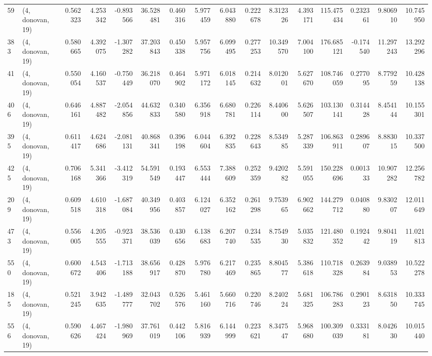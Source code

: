 \begin{tabular}{llrrrrrrrrrrrrrr}
59  &  (4, donovan, 19) &   0.562323 &   4.253342 &  -0.893566 &    36.528481 &   0.460316 &   5.977459 &   6.043880 &  0.222678 &   8.312326 &   4.393171 &   115.475434 &  0.232361 &   9.806910 &  10.745950 \\
383 &  (4, donovan, 19) &   0.580665 &   4.392075 &  -1.307282 &    37.203843 &   0.450338 &   5.957756 &   6.099495 &  0.277253 &  10.349570 &   7.004100 &   176.685121 & -0.174540 &  11.297243 &  13.292296 \\
41  &  (4, donovan, 19) &   0.550054 &   4.160537 &  -0.750449 &    36.218070 &   0.464902 &   5.971172 &   6.018145 &  0.214632 &   8.012001 &   5.627670 &   108.746059 &  0.277095 &   8.779259 &  10.428138 \\
406 &  (4, donovan, 19) &   0.646161 &   4.887482 &  -2.054856 &    44.632833 &   0.340580 &   6.356918 &   6.680781 &  0.226114 &   8.440600 &   5.626507 &   103.130141 &  0.314428 &   8.454144 &  10.155301 \\
395 &  (4, donovan, 19) &   0.611417 &   4.624686 &  -2.081131 &    40.868341 &   0.396198 &   6.044604 &   6.392835 &  0.228643 &   8.534985 &   5.287339 &   106.863911 &  0.289607 &   8.883015 &  10.337500 \\
425 &  (4, donovan, 19) &   0.706168 &   5.341366 &  -3.412319 &    54.591549 &   0.193447 &   6.553444 &   7.388609 &  0.252359 &   9.420282 &   5.591055 &   150.228696 &  0.001333 &  10.907282 &  12.256782 \\
209 &  (4, donovan, 19) &   0.609518 &   4.610318 &  -1.687084 &    40.349956 &   0.403857 &   6.124027 &   6.352162 &  0.261298 &   9.753965 &   6.902662 &   144.279712 &  0.040880 &   9.830207 &  12.011649 \\
473 &  (4, donovan, 19) &   0.556005 &   4.205555 &  -0.923371 &    38.536039 &   0.430656 &   6.138683 &   6.207740 &  0.234535 &   8.754930 &   5.035832 &   121.480352 &  0.192442 &   9.804119 &  11.021813 \\
550 &  (4, donovan, 19) &   0.600672 &   4.543406 &  -1.713188 &    38.656917 &   0.428870 &   5.976780 &   6.217469 &  0.235865 &   8.804577 &   5.386618 &   110.718328 &  0.263984 &   9.038953 &  10.522278 \\
185 &  (4, donovan, 19) &   0.521245 &   3.942635 &  -1.489777 &    32.043702 &   0.526576 &   5.461160 &   5.660716 &  0.220746 &   8.240224 &   5.681325 &   106.786283 &  0.290123 &   8.631850 &  10.333745 \\
556 &  (4, donovan, 19) &   0.590626 &   4.467424 &  -1.980969 &    37.761019 &   0.442106 &   5.816939 &   6.144999 &  0.223621 &   8.347547 &   5.968680 &   100.309039 &  0.333181 &   8.042630 &  10.015440 \\

\end{tabular}

